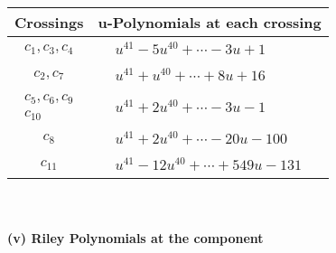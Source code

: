 \documentclass[1p]{elsarticle_modified}
\theoremstyle{definition}
\begin{document}
\begin{tabular}{m{50pt}|m{274pt}}
Crossings & \hspace{64pt}u-Polynomials at each crossing \\
\hline $$\begin{aligned}c_{1},c_{3},c_{4}\end{aligned}$$&$\begin{aligned}
&u^{41}-5 u^{40}+\cdots-3 u+1
\end{aligned}$\\
\hline $$\begin{aligned}c_{2},c_{7}\end{aligned}$$&$\begin{aligned}
&u^{41}+u^{40}+\cdots+8 u+16
\end{aligned}$\\
\hline $$\begin{aligned}c_{5},c_{6},c_{9}\\c_{10}\end{aligned}$$&$\begin{aligned}
&u^{41}+2 u^{40}+\cdots-3 u-1
\end{aligned}$\\
\hline $$\begin{aligned}c_{8}\end{aligned}$$&$\begin{aligned}
&u^{41}+2 u^{40}+\cdots-20 u-100
\end{aligned}$\\
\hline $$\begin{aligned}c_{11}\end{aligned}$$&$\begin{aligned}
&u^{41}-12 u^{40}+\cdots+549 u-131
\end{aligned}$\\
\hline
\end{tabular}\\~\\
\newpage\renewcommand{\arraystretch}{1}
\flushleft \textbf{(v) Riley Polynomials at the component}\newline \\
\end{document}
